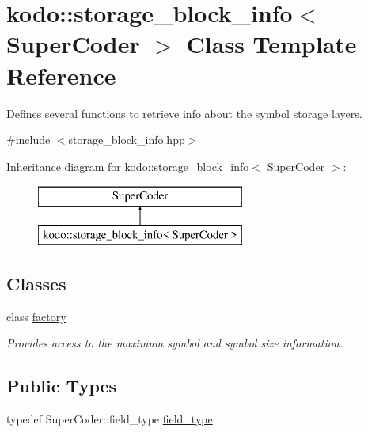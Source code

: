 \hypertarget{classkodo_1_1storage__block__info}{\section{kodo\-:\-:storage\-\_\-block\-\_\-info$<$ Super\-Coder $>$ Class Template Reference}
\label{classkodo_1_1storage__block__info}
}


Defines several functions to retrieve info about the symbol storage layers.  




{\ttfamily \#include $<$storage\-\_\-block\-\_\-info.\-hpp$>$}

Inheritance diagram for kodo\-:\-:storage\-\_\-block\-\_\-info$<$ Super\-Coder $>$\-:\begin{figure}[H]
\begin{center}
\leavevmode
\includegraphics[height=2.000000cm]{classkodo_1_1storage__block__info}
\end{center}
\end{figure}
\subsection*{Classes}
\begin{DoxyCompactItemize}
\item 
class \hyperlink{classkodo_1_1storage__block__info_1_1factory}{factory}
\begin{DoxyCompactList}\small\item\em Provides access to the maximum symbol and symbol size information. \end{DoxyCompactList}\end{DoxyCompactItemize}
\subsection*{Public Types}
\begin{DoxyCompactItemize}
\item 
typedef Super\-Coder\-::field\-\_\-type \hyperlink{classkodo_1_1storage__block__info_a09bd665ed62c1f90cc142eaffe48d203}{field\-\_\-type}
\begin{DoxyCompactList}\small\item\em \end{DoxyCompactList}\end{DoxyCompactItemize}
